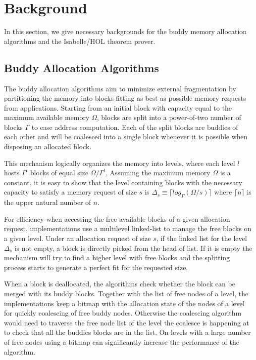 \section{Background}
In this section, we give necessary backgrounds for the buddy memory allocation algorithms and the Isabelle/HOL theorem prover.

\subsection{Buddy Allocation Algorithms}\label{sec:buddy}
The buddy allocation algorithms aim to minimize external fragmentation by partitioning the memory into blocks fitting as best as possible memory requests from applications. Starting from an initial block with capacity equal to the maximum available memory $\Omega$, blocks are split into a power-of-two number of blocks $\Gamma$ to ease address computation. Each of the split blocks are buddies of each other and will be coalesced into a single block whenever it is possible when disposing an allocated block.

This mechanism logically organizes the memory into levels, where each level $l$ hosts $\Gamma^l$ blocks of equal size $\Omega/{\Gamma}^l$. Assuming the maximum memory $\Omega$ is a constant, it is easy to show that the level containing blocks with the necessary capacity to satisfy a memory request of size $s$ is $\Delta_s \equiv \lceil log_\Gamma (\Omega / s) \rceil$ where $\lceil n \rceil$ is the upper natural number of $n$.

For efficiency when accessing the free available blocks of a given allocation request, implementations use a multilevel linked-list to manage the free blocks on a given level. Under an allocation request of size $s$, if the linked list for the level $\Delta_s$ is not empty, a block is directly picked from the head of list. If it is empty the mechanism will try to find a higher level with free blocks and the splitting process starts to generate a perfect fit for the requested size. 

When a block is deallocated, the algorithms check whether the block can be merged with its buddy blocks. Together with the list of free nodes of a level, the implementations keep a bitmap with the allocation state of the nodes of a level for quickly coalescing of free buddy nodes. Otherwise the coalescing algorithm would need to traverse the free node list of the level the coalesce is happening at to check that all the buddies blocks are in the list. On levels with a large number of free nodes using a bitmap can significantly increase the performance of the algorithm.

